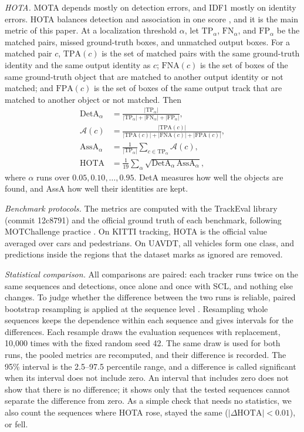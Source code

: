 \documentclass[pdflatex,sn-mathphys-num,iicol]{sn-jnl}
\newcommand{\scl}{SCL}
\begin{document}
\emph{HOTA.} MOTA depends mostly on detection errors, and IDF1 mostly on identity errors. HOTA
balances detection and association in one score \cite{luiten2021hota}, and it is the main metric
of this paper. At a localization threshold $\alpha$, let $\mathrm{TP}_\alpha$, $\mathrm{FN}_\alpha$,
and $\mathrm{FP}_\alpha$ be the matched pairs, missed ground-truth boxes, and unmatched output boxes.
For a matched pair $c$, $\mathrm{TPA}(c)$ is the set of matched pairs with the same ground-truth
identity and the same output identity as $c$; $\mathrm{FNA}(c)$ is the set of boxes of the same
ground-truth object that are matched to another output identity or not matched; and
$\mathrm{FPA}(c)$ is the set of boxes of the same output track that are matched to another object
or not matched. Then
\begin{align}
\mathrm{DetA}_\alpha&=\frac{|\mathrm{TP}_\alpha|}{|\mathrm{TP}_\alpha|+|\mathrm{FN}_\alpha|+|\mathrm{FP}_\alpha|},\label{eq:deta}\\
\mathcal{A}(c)&=\frac{|\mathrm{TPA}(c)|}{|\mathrm{TPA}(c)|+|\mathrm{FNA}(c)|+|\mathrm{FPA}(c)|},\label{eq:ac}\\
\mathrm{AssA}_\alpha&=\frac{1}{|\mathrm{TP}_\alpha|}\sum_{c\in\mathrm{TP}_\alpha}\mathcal{A}(c),\label{eq:assa}\\
\mathrm{HOTA}&=\frac{1}{19}\sum_{\alpha}\sqrt{\mathrm{DetA}_\alpha\,\mathrm{AssA}_\alpha},\label{eq:hota}
\end{align}
where $\alpha$ runs over $0.05, 0.10, \dots, 0.95$. DetA measures how well the objects are found,
and AssA how well their identities are kept.

\emph{Benchmark protocols.} The metrics are computed with the TrackEval library (commit 12c8791)
and the official ground truth of each benchmark, following MOTChallenge practice
\cite{dendorfer2021motchallenge}. On KITTI tracking, HOTA is the official value averaged over cars
and pedestrians. On UAVDT, all vehicles form one class, and predictions inside the regions that the
dataset marks as ignored are removed.

\emph{Statistical comparison.} All comparisons are paired: each tracker runs twice on the same
sequences and detections, once alone and once with \scl{}, and nothing else changes. To judge
whether the difference between the two runs is reliable, paired bootstrap resampling is applied at
the sequence level \cite{efron1993bootstrap}. Resampling whole sequences keeps the dependence within
each sequence and gives intervals for the differences. Each resample draws the evaluation sequences
with replacement, 10,000 times with the fixed random seed 42. The same draw is used for both runs,
the pooled metrics are recomputed, and their difference is recorded. The 95\% interval is the
2.5--97.5 percentile range, and a difference is called significant when its interval does not
include zero. An interval that includes zero does not show that there is no difference; it shows
only that the tested sequences cannot separate the difference from zero. As a simple check that needs no statistics, we also count the sequences where HOTA
rose, stayed the same ($|\Delta\mathrm{HOTA}|<0.01$), or fell.
\end{document}
